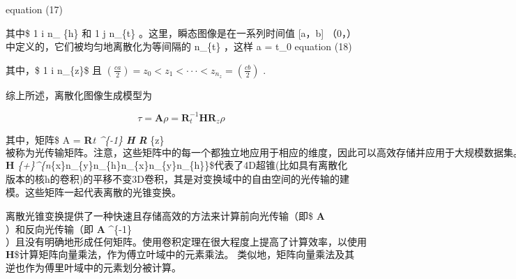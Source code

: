 \documentclass[11pt]{article}
\begin{document}
 equation (17)

其中\$ 1 \leqslant i \leqslant n\_ \{h\} \(和\) 1 \leqslant j
\leqslant n\_\{t\} \(。 这里，瞬态图像是在一系列时间值\) {[}a，b{]}
\in（0，\infty）\(中定义的，它们被均匀地离散化为等间隔的\) n\_\{t\}
\(，这样\) a = t\_0 equation (18)

其中，\$ 1 \leqslant i \leqslant n\_\{z\}\$ 且
\((\frac{ca}{2})=z_{0}< z_{1} < ··· < z_{n_{z}} = (\frac{cb}{2})\) .

综上所述，离散化图像生成模型为

\[\tau = \textbf{A} \rho = \textbf{R}_t^{-1}\textbf{H}\textbf{R}_{z}\rho\]

其中，矩阵\$ A = \textbf {R}\emph{t \^{}\{-1\} \textbf {H} \textbf {R}}
\{z\}
\(被称为光传输矩阵。 注意，这些矩阵中的每一个都独立地应用于相应的维度，因此可以高效存储并应用于大规模数据集。矩阵\)\textbf{H}
\in {}\emph{\{+\}\^{}\{n}\{x\}n\_\{y\}n\_\{h\}\times n\_\{x\}n\_\{y\}n\_\{h\}\}\$代表了4D超锥(比如具有离散化版本的核h的卷积)的平移不变3D卷积，其是对变换域中的自由空间的光传输的建模。这些矩阵一起代表离散的光锥变换。

离散光锥变换提供了一种快速且存储高效的方法来计算前向光传输（即\$
\textbf {A} \rho \(）和反向光传输（即\) \textbf {A} \^{}\{-1\}
\rho \(）且没有明确地形成任何矩阵。使用卷积定理在很大程度上提高了计算效率，以使用\)\textbf {H}\$计算矩阵向量乘法，作为傅立叶域中的元素乘法。
类似地，矩阵向量乘法及其逆也作为傅里叶域中的元素划分被计算。
\end{document}

